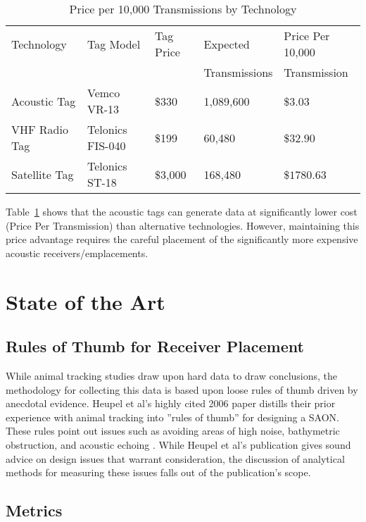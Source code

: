 \begin{table}[ht]
	\begin{tabular}{l l l l l}
		Technology&Tag Model&Tag Price&Expected&Price Per 10,000\\
		&&&Transmissions&Transmission\\
		\hline
		Acoustic Tag		& Vemco VR-13		& \$330		& 1,089,600	& \$$3.03$\\
		VHF Radio Tag		& Telonics FIS-040	& \$199		& 60,480	& \$$32.90$\\
		Satellite Tag		& Telonics ST-18	& \$3,000	& 168,480	& \$$1780.63$\\
			\end{tabular}
	\caption{Price per 10,000 Transmissions by Technology
		\label{PricePerTx}}
\end{table}

Table~\ref{PricePerTx} shows that the acoustic tags can generate data at significantly lower cost (Price Per Transmission) than alternative technologies.  However, maintaining this price advantage requires the careful placement of the significantly more expensive acoustic receivers/emplacements.  

\section{State of the Art}

\subsection{Rules of Thumb for Receiver Placement}
\label{RulesOfThumb}
While animal tracking studies draw upon hard data to draw conclusions, the methodology for collecting this data is based upon loose rules of thumb driven by anecdotal evidence.  Heupel et al's highly cited 2006 paper distills their prior experience with animal tracking into ''rules of thumb'' for designing a SAON.  These rules point out issues such as avoiding areas of high noise, bathymetric obstruction, and acoustic echoing \cite{Heupel2006}.  While Heupel et al's publication gives sound advice on design issues that warrant consideration, the discussion of analytical methods for measuring these issues falls out of the publication's scope.


\subsection{Metrics}
